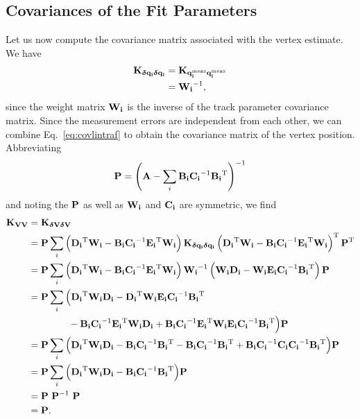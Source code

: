 \documentclass[12pt,a4paper]{scrarticle}
\begin{document}
\subsection{Covariances of the Fit Parameters}
Let us now compute the covariance matrix associated with the vertex estimate. We have
\begin{align*}
    \mathbf{K}_{\mathbf{\bm{\delta} \mathbf{q_{i}}} \mathbf{\bm{\delta} \mathbf{q_{i}}}} 
        &= \mathbf{K}_{\mathbf{\mathbf{q_{i}^\text{meas}}} \mathbf{\mathbf{q_{i}^\text{meas}}}} \\
        &= \mathbf{W_{i}}^{-1},
\end{align*}
since the weight matrix $\mathbf{W_{i}}$ is the inverse of the track parameter covariance matrix. Since the measurement errors are independent from each other, we can combine Eq.~\ref{eq:covlintraf} to obtain the covariance matrix of the vertex position. Abbreviating
\begin{align*}
    \mathbf{P} = \left( \mathbf{A} - \sum_i \mathbf{B_{i}} \mathbf{C_{i}}^{-1} \mathbf{B_{i}}^{\mathrm{T}} \right)^{-1}
\end{align*}
and noting the $\mathbf{P}$ as well as $\mathbf{W_{i}}$ and $\mathbf{C_{i}}$ are symmetric, we find
\begin{align*}
    \CovMat{V} 
        &= \CovMat{\dVBilloir} \\
        &= \mat{P} \sum_i \left(\DBilloir{i}^{\transpose} \WBilloir{i} - \BBilloir{i} \CBilloir{i}^{-1}  \EBilloir{i}^{\transpose} \WBilloir{i}\right) \CovMat{\dqBilloir{i}}  \left(\DBilloir{i}^{\transpose} \WBilloir{i} - \BBilloir{i} \CBilloir{i}^{-1}  \EBilloir{i}^{\transpose} \WBilloir{i}\right)^\transpose \mat{P}^\transpose \\
        &= \mat{P} \sum_i \left(
        \DBilloir{i}^{\transpose} \WBilloir{i} 
        - \BBilloir{i} \CBilloir{i}^{-1}  \EBilloir{i}^{\transpose} \WBilloir{i}\right) 
        \WBilloir{i}^{-1} 
        \left(\WBilloir{i} \DBilloir{i} 
        - \WBilloir{i} \EBilloir{i} \CBilloir{i}^{-1} \BBilloir{i}^\transpose \right) 
        \mat{P} \\
        &= \mat{P} \sum_i \Big(
        \DBilloir{i}^{\transpose} \WBilloir{i} \DBilloir{i} 
        - \DBilloir{i}^{\transpose} \WBilloir{i} \EBilloir{i} \CBilloir{i}^{-1} \BBilloir{i}^\transpose \\
        &\hphantom{= \mat{P} \sum_i \Big(} - \BBilloir{i} \CBilloir{i}^{-1}  \EBilloir{i}^{\transpose} \WBilloir{i} \DBilloir{i}
        +\BBilloir{i} \CBilloir{i}^{-1}  \EBilloir{i}^{\transpose} \WBilloir{i} \EBilloir{i} \CBilloir{i}^{-1} \BBilloir{i}^\transpose
        \Big) \mat{P} \\ 
        &= \mat{P} \sum_i \Big(
        \DBilloir{i}^{\transpose} \WBilloir{i} \DBilloir{i} 
        - \BBilloir{i} \CBilloir{i}^{-1} \BBilloir{i}^\transpose  
        - \BBilloir{i} \CBilloir{i}^{-1} \BBilloir{i}^\transpose
        +\BBilloir{i} \CBilloir{i}^{-1}  \CBilloir{i} \CBilloir{i}^{-1} \BBilloir{i}^\transpose
        \Big) \mat{P} \\
        &= \mat{P} \sum_i \Big(
        \DBilloir{i}^{\transpose} \WBilloir{i} \DBilloir{i} 
        - \BBilloir{i} \CBilloir{i}^{-1} \BBilloir{i}^\transpose  
        \Big) \mat{P} \\
        &= \mat{P} \ \mat{P}^{-1} \ \mat{P} \\
        &= \mat{P}.  
\end{align*}
\end{document}
